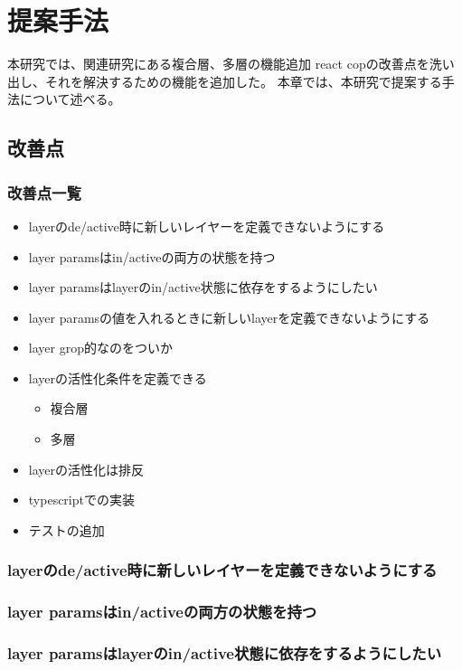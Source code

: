 \documentclass{jsarticle}
\begin{document}
    \fi
    \section{提案手法}
    本研究では、関連研究にある複合層、多層の機能追加
    react copの改善点を洗い出し、それを解決するための機能を追加した。
    本章では、本研究で提案する手法について述べる。

    \subsection{改善点}

    \subsubsection{改善点一覧}
    \begin{itemize}
    \item layerのde/active時に新しいレイヤーを定義できないようにする
    \item layer paramsはin/activeの両方の状態を持つ
    \item layer paramsはlayerのin/active状態に依存をするようにしたい
    \item layer paramsの値を入れるときに新しいlayerを定義できないようにする
    \item layer grop的なのをついか
    \item layerの活性化条件を定義できる
    \begin{itemize}
    \item 複合層
    \item 多層
    \end{itemize}
    \item layerの活性化は排反
    \item typescriptでの実装
    \item テストの追加
    \end{itemize}

    \subsubsection{layerのde/active時に新しいレイヤーを定義できないようにする}

    \subsubsection{layer paramsはin/activeの両方の状態を持つ}

    \subsubsection{layer paramsはlayerのin/active状態に依存をするようにしたい}
\end{document}

